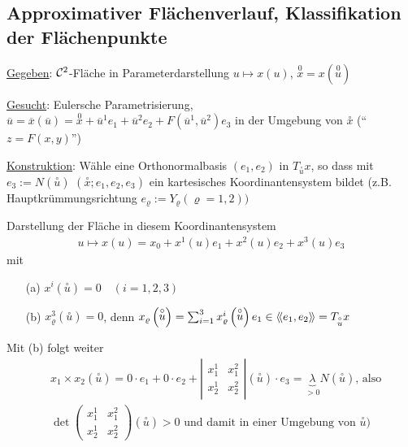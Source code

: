 \subsection{Approximativer Flächenverlauf, Klassifikation der Flächenpunkte}
\uline{Gegeben}: \(\mathcal{C}^2\)-Fläche in Parameterdarstellung \(u \mapsto x(u)\), \(\stackrel{0}{x} = x(\stackrel{0}{u})\) \par
\uline{Gesucht}: Eulersche Parametrisierung, \(\overline u = \overline x(\overline u) = \stackrel{0}{x}+ \overline u^1 e_1 + \overline u^2 e_2 + F(\overline u^1, \overline u^2) e_3\) in der Umgebung von \(\stackrel \circ x\) \quad (``\(z = F(x,y)\)'') \par
\uline{Konstruktion}: Wähle eine Orthonormalbasis \((e_1, e_2)\) in \(T_{\stackrel \circ u}x\), so dass mit \(e_3 := N\left(\stackrel \circ u\right)\) \(\left(\stackrel \circ x; e_1, e_2, e_3\right)\) ein kartesisches Koordinantensystem bildet (z.B. Hauptkrümmungsrichtung \(e_\varrho := Y_\varrho (\varrho = 1,2))\) \par
Darstellung der Fläche in diesem Koordinantensystem
\begin{align*}
 u \mapsto x(u) = x_0 + x^1(u) e_1 + x^2(u) e_2 + x^3(u) e_3
\end{align*}
mit
\begin{enumerate}
 \item[(a)] \(x^i \left(\stackrel \circ u\right) = 0 \quad (i = 1,2,3)\)
 \item[(b)] \(x^3_\varrho\left(\stackrel \circ u\right) = 0\), denn \(x_\varrho \left(\stackrel \circ u\right) = \sum_{i = 1}^3 x^i_\varrho \left(\stackrel \circ u\right) e_1 \in \left\langle\!\left\langle e_1, e_2\right\rangle\!\right\rangle = T_{\stackrel \circ u}x\)
\end{enumerate}
Mit (b) folgt weiter
\begin{align*}
 &x_1 \times x_2 \left(\stackrel \circ u\right) = 0 \cdot e_1 + 0 \cdot e_2 + \left|\begin{matrix}
                                                                     x_1^1 & x_1^2 \\
                                                                     x_2^1 & x_2^2
                                                                    \end{matrix}\right|\left(\stackrel \circ u\right) \cdot e_3 = \underbrace{\lambda}_{> 0} N\left(\stackrel \circ u \right)\text{, also}\\
&\det \begin{pmatrix}
      x_1^1 & x_1^2 \\
      x_2^1 & x_2^2
     \end{pmatrix} \left(\stackrel \circ u\right) > 0 \text{ und damit in einer Umgebung von } \stackrel \circ u)
\end{align*}


